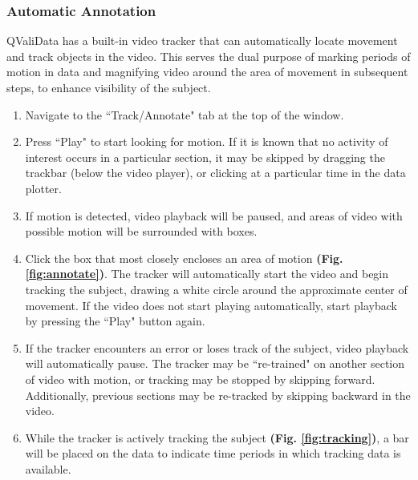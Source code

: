 \documentclass[]{article}
\begin{document}
	\subsubsection{Automatic Annotation}
		QValiData has a built-in video tracker that can automatically locate movement and track objects in the video. This serves the dual purpose of marking periods of motion in data and magnifying video around the area of movement in subsequent steps, to enhance visibility of the subject.
		\begin{enumerate}
			\item Navigate to the ``Track/Annotate" tab at the top of the window.
			\item Press ``Play" to start looking for motion. If it is known that no activity of interest occurs in a particular section, it may be skipped by dragging the trackbar (below the video player), or clicking at a particular time in the data plotter. 
			\item If motion is detected, video playback will be paused, and areas of video with possible motion will be surrounded with boxes.
			\item Click the box that most closely encloses an area of motion \textbf{(Fig. \ref{fig:annotate})}. The tracker will automatically start the video and begin tracking the subject, drawing a white circle around the approximate center of movement. If the video does not start playing automatically, start playback by pressing the ``Play" button again.
			\item If the tracker encounters an error or loses track of the subject, video playback will automatically pause. The tracker may be ``re-trained" on another section of video with motion, or tracking may be stopped by skipping forward. Additionally, previous sections may be re-tracked by skipping backward in the video.
			\item While the tracker is actively tracking the subject \textbf{(Fig. \ref{fig:tracking})}, a bar will be placed on the data to indicate time periods in which tracking data is available.
		\end{enumerate}
\end{document}
